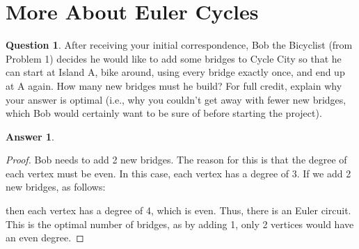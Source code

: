 \documentclass[article, 12pt]{article}
\theoremstyle{definition}
\newtheorem{question}{Question}
\newtheorem{answer}{Answer}
\begin{document}
    \section{More About Euler Cycles}
    \begin{question}
        After receiving your initial correspondence, Bob the Bicyclist (from Problem 1) decides he would like to add some bridges to Cycle City so that he can start at Island A, bike around, using every bridge exactly once, and end up at A again. How many new bridges must he build? For full credit, explain why your answer is optimal (i.e., why you couldn't get away with fewer new bridges, which Bob would certainly want to be sure of before starting the project).
    \end{question}
    \begin{answer}
        \begin{proof}
            Bob needs to add 2 new bridges. The reason for this is that the degree of each vertex must be even. In this case, each vertex has a degree of 3. If we add 2 new bridges, as follows:
            \begin{figure}[H]
                \centering
            \end{figure}
            then each vertex has a degree of 4, which is even. Thus, there is an Euler circuit. This is the optimal number of bridges, as by adding 1, only 2 vertices would have an even degree.
        \end{proof}
    \end{answer}
\end{document}
